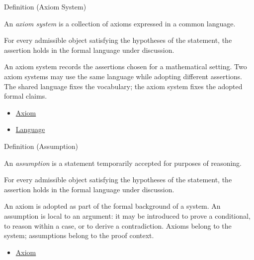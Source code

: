 \begin{definitionbox}{Definition (Axiom System)}
\begin{definition}
\label{def:axiom-system}
An \emph{axiom system} is a collection of axioms expressed in a common
language.
\end{definition}
\end{definitionbox}
\begin{remark*}
For every admissible object satisfying the hypotheses of the statement, the
assertion holds in the formal language under discussion.
\end{remark*}


\begin{remark*}[Interpretation]
An axiom system records the assertions chosen for a mathematical setting. Two
axiom systems may use the same language while adopting different assertions.
The shared language fixes the vocabulary; the axiom system fixes the adopted
formal claims.
\end{remark*}

\begin{dependencies}
\begin{itemize}
  \item \hyperref[def:axiom]{Axiom}
  \item \hyperref[def:language]{Language}
\end{itemize}
\end{dependencies}

\begin{definitionbox}{Definition (Assumption)}
\begin{definition}[Assumption]
\label{def:assumption}
An \emph{assumption} is a statement temporarily accepted for purposes of
reasoning.
\end{definition}
\end{definitionbox}
\begin{remark*}
For every admissible object satisfying the hypotheses of the statement, the
assertion holds in the formal language under discussion.
\end{remark*}


\begin{remark*}[Interpretation]
An axiom is adopted as part of the formal background of a system. An
assumption is local to an argument: it may be introduced to prove a conditional,
to reason within a case, or to derive a contradiction. Axioms belong to the
system; assumptions belong to the proof context.
\end{remark*}

\begin{dependencies}
\begin{itemize}
  \item \hyperref[def:axiom]{Axiom}
\end{itemize}
\end{dependencies}
